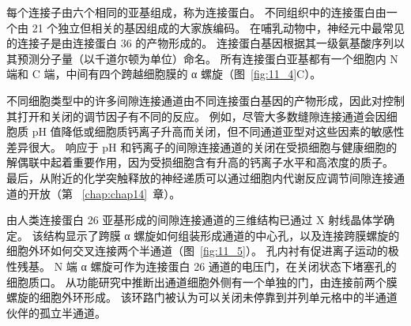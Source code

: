 每个连接子由六个相同的亚基组成，称为连接蛋白。
不同组织中的连接蛋白由一个由 21 个独立但相关的基因组成的大家族编码。
在哺乳动物中，神经元中最常见的连接子是由连接蛋白 36 的产物形成的。
连接蛋白基因根据其一级氨基酸序列以其预测分子量（以千道尔顿为单位）命名。
所有连接蛋白亚基都有一个细胞内 N 端和 C 端，中间有四个跨越细胞膜的 α 螺旋（图~\ref{fig:11_4}C）。


不同细胞类型中的许多间隙连接通道由不同连接蛋白基因的产物形成，因此对控制其打开和关闭的调节因子有不同的反应。
例如，尽管大多数缝隙连接通道会因细胞质 pH 值降低或细胞质钙离子升高而关闭，但不同通道亚型对这些因素的敏感性差异很大。
响应于 pH 和钙离子的间隙连接通道的关闭在受损细胞与健康细胞的解偶联中起着重要作用，因为受损细胞含有升高的钙离子水平和高浓度的质子。
最后，从附近的化学突触释放的神经递质可以通过细胞内代谢反应调节间隙连接通道的开放（第 ~\ref{chap:chap14}~章）。


由人类连接蛋白 26 亚基形成的间隙连接通道的三维结构已通过 X 射线晶体学确定。
该结构显示了跨膜 α 螺旋如何组装形成通道的中心孔，以及连接跨膜螺旋的细胞外环如何交叉连接两个半通道（图~\ref{fig:11_5}）。
孔内衬有促进离子运动的极性残基。
N 端 α 螺旋可作为连接蛋白 26 通道的电压门，在关闭状态下堵塞孔的细胞质口。
从功能研究中推断出通道细胞外侧有一个单独的门，由连接前两个膜螺旋的细胞外环形成。
该环路门被认为可以关闭未停靠到并列单元格中的半通道伙伴的孤立半通道。


